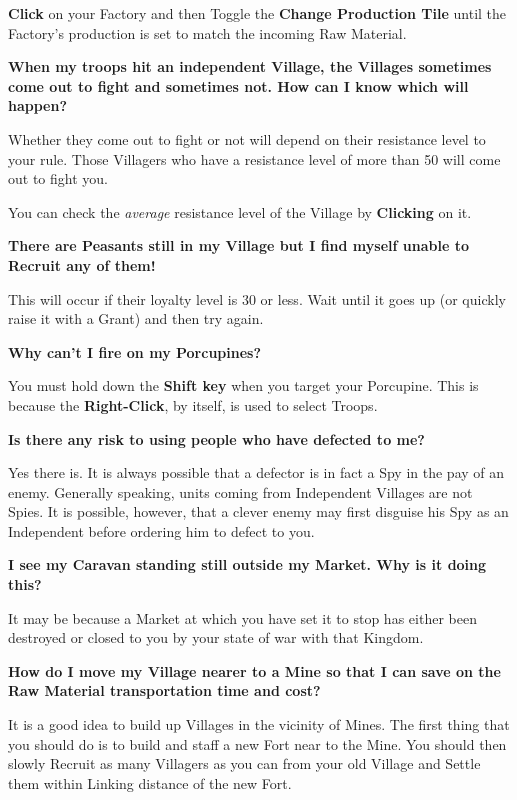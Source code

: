\textbf{Click} on your Factory and then Toggle the \textbf{Change Production Tile} until the Factory’s production is set to match the incoming Raw Material.

{\large \textbf{\textsf{When my troops hit an independent Village, the Villages sometimes come out to fight and sometimes not. How can I know which will happen?}}}

Whether they come out to fight or not will depend on their resistance level to your rule. Those Villagers who have a resistance level of more than 50 will come out to fight you.

You can check the \textit{average} resistance level of the Village by \textbf{Clicking} on it.

{\large \textbf{\textsf{There are Peasants still in my Village but I find myself unable to Recruit any of them!}}}

This will occur if their loyalty level is 30 or less. Wait until it goes up (or quickly raise it with a Grant) and then try again.

{\large \textbf{\textsf{Why can’t I fire on my Porcupines?}}}

You must hold down the \textbf{Shift key} when you target your Porcupine. This is because the \textbf{Right-Click}, by itself, is used to select Troops.

{\large \textbf{\textsf{Is there any risk to using people who have defected to me?}}}

Yes there is. It is always possible that a defector is in fact a Spy in the pay of an enemy. Generally speaking, units coming from Independent Villages are not Spies. It is possible, however, that a clever enemy may first disguise his Spy as an Independent before ordering him to defect to you.

{\large \textbf{\textsf{I see my Caravan standing still outside my Market. Why is it doing this?}}}

It may be because a Market at which you have set it to stop has either been destroyed or closed to you by your state of war with that Kingdom.

{\large \textbf{\textsf{How do I move my Village nearer to a Mine so that I can save on the Raw Material transportation time and cost?}}}

It is a good idea to build up Villages in the vicinity of Mines. The first thing that you should do is to build and staff a new Fort near to the Mine. You should then slowly Recruit as many Villagers as you can from your old Village and Settle them within Linking distance of the new Fort.

